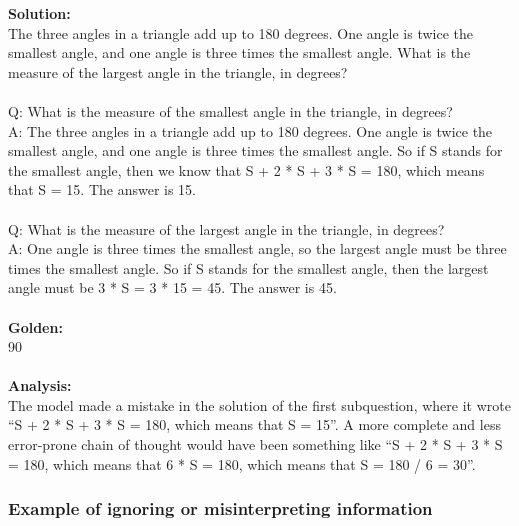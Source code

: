 \textbf{Solution:} \\
The three angles in a triangle add up to 180 degrees. One angle is twice the smallest angle, and one angle is three times the smallest angle. What is the measure of the largest angle in the triangle, in degrees? \\
 \\
Q: What is the measure of the smallest angle in the triangle, in degrees? \\
A: The three angles in a triangle add up to 180 degrees. One angle is twice the smallest angle, and one angle is three times the smallest angle. So if S stands for the smallest angle, then we know that S + 2 * S + 3 * S = 180, which means that S = 15. The answer is 15. \\
 \\
Q: What is the measure of the largest angle in the triangle, in degrees? \\
A: One angle is three times the smallest angle, so the largest angle must be three times the smallest angle. So if S stands for the smallest angle, then the largest angle must be 3 * S = 3 * 15 = 45. The answer is 45. \\
 \\
\textbf{Golden:} \\
90 \\
 \\
\textbf{Analysis:} \\
The model made a mistake in the solution of the first subquestion, where it wrote ``S + 2 * S + 3 * S = 180, which means that S = 15''. A more complete and less error-prone chain of thought would have been something like ``S + 2 * S + 3 * S = 180, which means that 6 * S = 180, which means that S = 180 / 6 = 30''.

\subsubsection{Example of ignoring or misinterpreting information}

